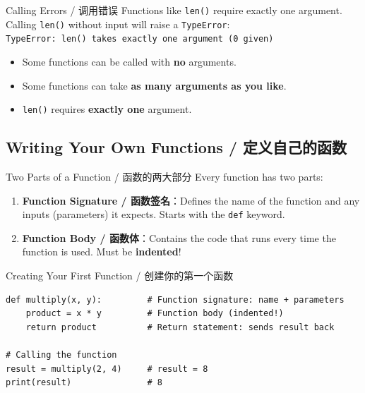 \documentclass[11pt,a4paper]{article}
\begin{document}
\begin{warning}{Calling Errors / 调用错误}
    Functions like \texttt{len()} require exactly one argument. Calling \texttt{len()} without input will raise a \texttt{TypeError}:\\
    \texttt{TypeError: len() takes exactly one argument (0 given)}

    \begin{itemize}[itemsep=0.3em]
        \item Some functions can be called with \textbf{no} arguments.
        \item Some functions can take \textbf{as many arguments as you like}.
        \item \texttt{len()} requires \textbf{exactly one} argument.
    \end{itemize}
\end{warning}

\subsection{Writing Your Own Functions / 定义自己的函数}

\begin{concept}{Two Parts of a Function / 函数的两大部分}
    Every function has two parts:
    \begin{enumerate}
        \item \textbf{Function Signature / 函数签名}：Defines the name of the function and any inputs (parameters) it expects. Starts with the \texttt{def} keyword.
        \item \textbf{Function Body / 函数体}：Contains the code that runs every time the function is used. Must be \textbf{indented}!
    \end{enumerate}
\end{concept}

\begin{examplebox}{Creating Your First Function / 创建你的第一个函数}
\begin{lstlisting}
def multiply(x, y):         # Function signature: name + parameters
    product = x * y         # Function body (indented!)
    return product          # Return statement: sends result back

# Calling the function
result = multiply(2, 4)     # result = 8
print(result)               # 8
\end{lstlisting}
\end{examplebox}
\end{document}
